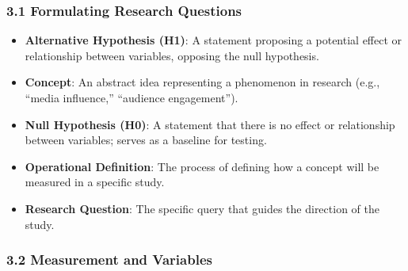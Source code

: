 \documentclass[
]{book}
\providecommand{\tightlist}{%
  \setlength{\itemsep}{0pt}\setlength{\parskip}{0pt}}
\begin{document}
\subsubsection*{\texorpdfstring{\textbf{3.1 Formulating Research Questions}}{3.1 Formulating Research Questions}}\label{formulating-research-questions-1}

\begin{itemize}
\tightlist
\item
  \textbf{Alternative Hypothesis (H1)}: A statement proposing a potential effect or relationship between variables, opposing the null hypothesis.
\item
  \textbf{Concept}: An abstract idea representing a phenomenon in research (e.g., ``media influence,'' ``audience engagement'').
\item
  \textbf{Null Hypothesis (H0)}: A statement that there is no effect or relationship between variables; serves as a baseline for testing.
\item
  \textbf{Operational Definition}: The process of defining how a concept will be measured in a specific study.
\item
  \textbf{Research Question}: The specific query that guides the direction of the study.
\end{itemize}

\subsubsection*{\texorpdfstring{\textbf{3.2 Measurement and Variables}}{3.2 Measurement and Variables}}\label{measurement-and-variables}
\end{document}
